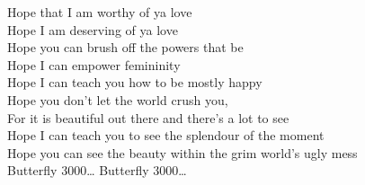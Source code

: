 Hope that I am worthy of ya love \\
Hope I am deserving of ya love \\
Hope you can brush off the powers that be \\
Hope I can empower femininity \\
Hope I can teach you how to be mostly happy \\
Hope you don't let the world crush you, \\
For it is beautiful out there and there's a lot to see \\
Hope I can teach you to see the splendour of the moment \\
Hope you can see the beauty within the grim world's ugly mess \\

Butterfly 3000… Butterfly 3000… \\
